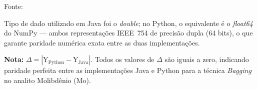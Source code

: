 \begin{table}[H]
\begin{threeparttable}
{}
\begin{center}
\begin{minipage}{0.85\linewidth}
\begin{tablenotes}
\footnotesize
\item Fonte:~\oautor
\item[a] Tipo de dado utilizado em Java foi o \textit{double}; no Python,
o equivalente é o \textit{float64} do NumPy — ambos representações IEEE~754
de precisão dupla (64 bits), o que garante paridade numérica exata entre as
duas implementações.
\item \textbf{Nota:} $\Delta = |\text{Y}_{\text{Python}} - \text{Y}_{\text{Java}}|$.
Todos os valores de $\Delta$ são iguais a zero, indicando paridade
perfeita entre as implementações Java e Python para a técnica \textit{Bagging}
no analito Molibdênio (Mo).
\end{tablenotes}
\end{minipage}
\end{center}
\end{threeparttable}
\end{table}

